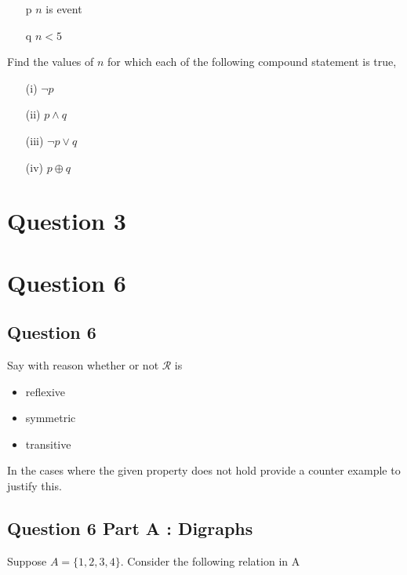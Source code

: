 \documentclass[]{report}
\begin{document}
\begin{itemize}
\item[p] $n$ is event
\item[q] $n<5$
\end{itemize}

Find the values of $n$ for which each of the following compound statement is true,

\begin{itemize}
\item[(i)] $\neg p$
\item[(ii)] $p \wedge q$
\item[(iii)] $\neg p \vee q$ 
\item[(iv)] $p \oplus q$
\end{itemize}

\newpage
\section*{Question 3}





\section*{Question 6}

\subsection{Question 6}
Say with reason whether or not $\mathcal{R}$ is
\begin{itemize}
\item reflexive
\item symmetric
\item transitive
\end{itemize}

In the cases where the given property does not hold provide a counter example to justify this.


\subsection*{Question 6 Part A : Digraphs}

Suppose $A = $$\{1,2,3,4\}$. Consider the following relation in A
\end{document}
